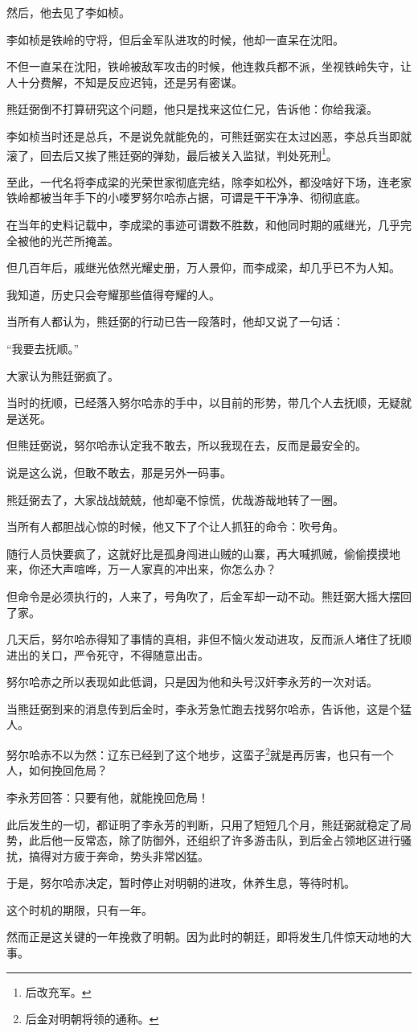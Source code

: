 \begin{multicols}{\theparacolNo}
然后，他去见了李如桢。

李如桢是铁岭的守将，但后金军队进攻的时候，他却一直呆在沈阳。

不但一直呆在沈阳，铁岭被敌军攻击的时候，他连救兵都不派，坐视铁岭失守，让人十分费解，不知是反应迟钝，还是另有密谋。

熊廷弼倒不打算研究这个问题，他只是找来这位仁兄，告诉他：你给我滚。

李如桢当时还是总兵，不是说免就能免的，可熊廷弼实在太过凶恶，李总兵当即就滚了，回去后又挨了熊廷弼的弹劾，最后被关入监狱，判处死刑\footnote{后改充军。}。

至此，一代名将李成梁的光荣世家彻底完结，除李如松外，都没啥好下场，连老家铁岭都被当年手下的小喽罗努尔哈赤占据，可谓是干干净净、彻彻底底。

在当年的史料记载中，李成梁的事迹可谓数不胜数，和他同时期的戚继光，几乎完全被他的光芒所掩盖。

但几百年后，戚继光依然光耀史册，万人景仰，而李成梁，却几乎已不为人知。

我知道，历史只会夸耀那些值得夸耀的人。

当所有人都认为，熊廷弼的行动已告一段落时，他却又说了一句话：

“我要去抚顺。”

大家认为熊廷弼疯了。

当时的抚顺，已经落入努尔哈赤的手中，以目前的形势，带几个人去抚顺，无疑就是送死。

但熊廷弼说，努尔哈赤认定我不敢去，所以我现在去，反而是最安全的。

说是这么说，但敢不敢去，那是另外一码事。

熊廷弼去了，大家战战兢兢，他却毫不惊慌，优哉游哉地转了一圈。

当所有人都胆战心惊的时候，他又下了个让人抓狂的命令：吹号角。

随行人员快要疯了，这就好比是孤身闯进山贼的山寨，再大喊抓贼，偷偷摸摸地来，你还大声喧哗，万一人家真的冲出来，你怎么办？

但命令是必须执行的，人来了，号角吹了，后金军却一动不动。熊廷弼大摇大摆回了家。

几天后，努尔哈赤得知了事情的真相，非但不恼火发动进攻，反而派人堵住了抚顺进出的关口，严令死守，不得随意出击。

努尔哈赤之所以表现如此低调，只是因为他和头号汉奸李永芳的一次对话。

当熊廷弼到来的消息传到后金时，李永芳急忙跑去找努尔哈赤，告诉他，这是个猛人。

努尔哈赤不以为然：辽东已经到了这个地步，这蛮子\footnote{后金对明朝将领的通称。}就是再厉害，也只有一个人，如何挽回危局？

李永芳回答：只要有他，就能挽回危局！

此后发生的一切，都证明了李永芳的判断，只用了短短几个月，熊廷弼就稳定了局势，此后他一反常态，除了防御外，还组织了许多游击队，到后金占领地区进行骚扰，搞得对方疲于奔命，势头非常凶猛。

于是，努尔哈赤决定，暂时停止对明朝的进攻，休养生息，等待时机。

这个时机的期限，只有一年。

然而正是这关键的一年挽救了明朝。因为此时的朝廷，即将发生几件惊天动地的大事。
\ifnum{}
	\end{multicols}
\fi
\newpage
